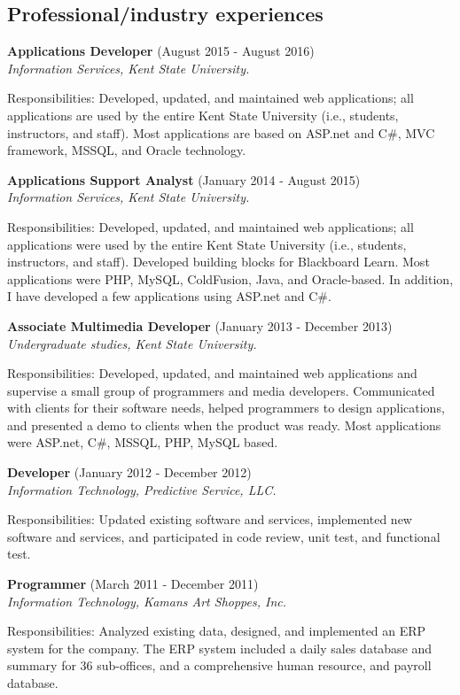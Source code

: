 \documentclass{article}
\begin{document}
\subsection*{Professional/industry experiences}\vspace{-0.5em}
\textbf{Applications Developer} (August 2015 - August 2016)\\
\textit{Information Services, Kent State University.}  
\begin{adjustwidth}{1cm}{}
Responsibilities: Developed, updated, and maintained web applications; all applications are used by the entire Kent State University (i.e., students, instructors, and staff). Most applications are based on ASP.net and C\#, MVC framework, MSSQL, and Oracle technology.
\end{adjustwidth}
\textbf{Applications Support Analyst} (January 2014 - August 2015)\\ 
\textit{Information Services, Kent State University.}                                	
\begin{adjustwidth}{1cm}{}
Responsibilities: Developed, updated, and maintained web applications; all applications were used by the entire Kent State University (i.e., students, instructors, and staff). Developed building blocks for Blackboard Learn. Most applications were PHP, MySQL, ColdFusion, Java, and Oracle-based. In addition, I have developed a few applications using ASP.net and C\#.
\end{adjustwidth}
\textbf{Associate Multimedia Developer} (January 2013 - December 2013)\\ 
\textit{Undergraduate studies, Kent State University.}                                	
\begin{adjustwidth}{1cm}{}
Responsibilities: Developed, updated, and maintained web applications and supervise a small group of programmers and media developers. Communicated with clients for their software needs, helped programmers to design applications, and presented a demo to clients when the product was ready. Most applications were ASP.net, C\#, MSSQL, PHP, MySQL based. 
\end{adjustwidth}
\textbf{Developer} (January 2012 - December 2012)\\ 
\textit{Information Technology, Predictive Service, LLC.}		
\begin{adjustwidth}{1cm}{}
Responsibilities: Updated existing software and services, implemented new software and services, and participated in code review, unit test, and functional test.
\end{adjustwidth}
\textbf{Programmer} (March 2011 - December 2011)\\
\textit{Information Technology, Kamans Art Shoppes, Inc.}		
\begin{adjustwidth}{1cm}{}
Responsibilities: Analyzed existing data, designed, and implemented an ERP system for the company. The ERP system included a daily sales database and summary for 36 sub-offices, and a comprehensive human resource, and payroll database.
\end{adjustwidth}
% 
\end{document}
